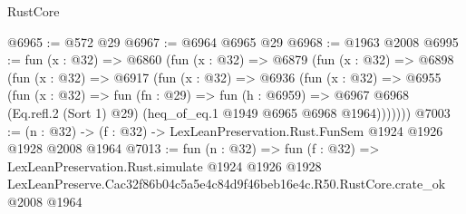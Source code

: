 \begin{lexlean}{RustCore}
\begin{coremodule}
@6965 := @572 @29
@6967 := @6964 @6965 @29
@6968 := @1963 @2008
@6995 := fun (x : @32) =>
  @6860
    (fun (x : @32) =>
    @6879
      (fun (x : @32) =>
      @6898
        (fun (x : @32) =>
        @6917
          (fun (x : @32) =>
          @6936
            (fun (x : @32) =>
            @6955
              (fun (x : @32) =>
              fun (fn : @29) =>
              fun (h : @6959) =>
              @6967 @6968 (Eq.refl.{2} (Sort 1) @29) (heq_of_eq.{1} @1949 @6965 @6968 @1964)))))))
@7003 := (n : @32) -> (f : @32) -> LexLeanPreservation.Rust.FunSem @1924 @1926 @1928 @2008 @1964
@7013 := fun (n : @32) =>
  fun (f : @32) =>
  LexLeanPreservation.Rust.simulate
    @1924
    @1926
    @1928
    LexLeanPreserve.Cac32f86b04c5a5e4c84d9f46beb16e4c.R50.RustCore.crate_ok
    @2008
    @1964
\end{coremodule}
\end{lexlean}
